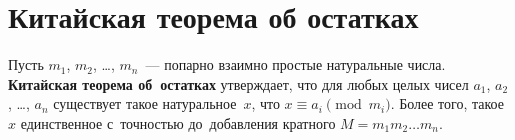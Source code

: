 
\section*{Китайская теорема об остатках}


Пусть $m_{1}$, $m_{2}$, \ldots, $m_{n}$~--- попарно взаимно простые натуральные
числа.
\\
\textbf{Китайская теорема об~остатках} утверждает, что для любых целых чисел
$a_{1}$, $a_{2}$, \ldots, $a_{n}$ существует такое натуральное~$x$, что
$x \equiv a_i  \pmod{m_{i}}$.
Более того, такое $x$ единственное с~точностью до~добавления кратного
$M = m_{1} m_{2} \ldots m_{n}$.

